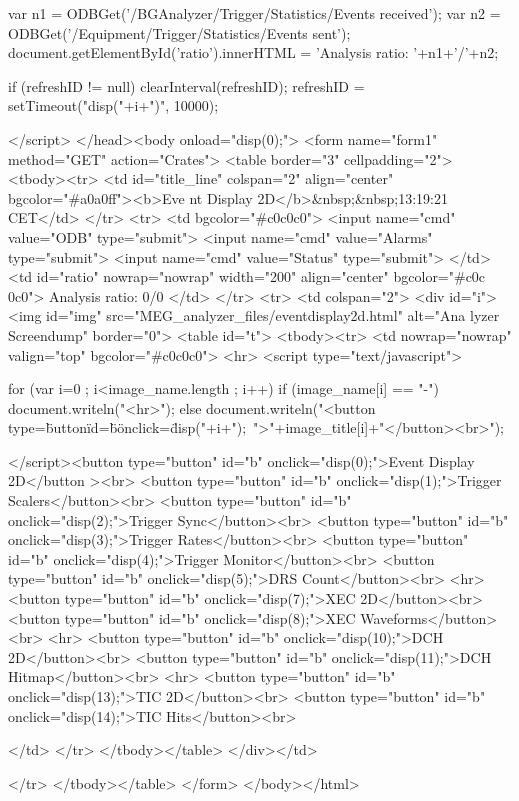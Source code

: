 \begin{DoxyCode}
{    var n1 = ODBGet('/BGAnalyzer/Trigger/Statistics/Events received');
    var n2 = ODBGet('/Equipment/Trigger/Statistics/Events sent');
    document.getElementById('ratio').innerHTML = 'Analysis ratio: '+n1+'/'+n2;

    if (refreshID != null)
      clearInterval(refreshID);
    refreshID = setTimeout("disp("+i+")", 10000);
  }
  
  </script>
  </head><body onload="disp(0);">
    <form name="form1" method="GET" action="Crates">
      <table border="3" cellpadding="2">
        <tbody><tr>
          <td id="title_line" colspan="2" align="center" bgcolor="#a0a0ff"><b>Eve
      nt Display 2D</b>&nbsp;&nbsp;13:19:21  CET</td>
        </tr>
        <tr>
          <td bgcolor="#c0c0c0">
            <input name="cmd" value="ODB" type="submit">
            <input name="cmd" value="Alarms" type="submit">
            <input name="cmd" value="Status" type="submit">
          </td>
          <td id="ratio" nowrap="nowrap" width="200" align="center" bgcolor="#c0c
      0c0">
            Analysis ratio: 0/0
          </td>
        </tr>  
        <tr>
          <td colspan="2">
            <div id="i">
              <img id="img" src="MEG_analyzer_files/eventdisplay2d.html" alt="Ana
      lyzer Screendump" border="0">
              <table id="t">
                <tbody><tr>
                  <td nowrap="nowrap" valign="top" bgcolor="#c0c0c0">
                    <hr>
<script type="text/javascript">

  for (var i=0 ; i<image_name.length ; i++)
    if (image_name[i] == "-")
       document.writeln("<hr>");
    else
       document.writeln("<button type=\"button\" id=\"b\" onclick=\"disp("+i+");\
      ">"+image_title[i]+"</button><br>");

</script><button type="button" id="b" onclick="disp(0);">Event Display 2D</button
      ><br>
<button type="button" id="b" onclick="disp(1);">Trigger Scalers</button><br>
<button type="button" id="b" onclick="disp(2);">Trigger Sync</button><br>
<button type="button" id="b" onclick="disp(3);">Trigger Rates</button><br>
<button type="button" id="b" onclick="disp(4);">Trigger Monitor</button><br>
<button type="button" id="b" onclick="disp(5);">DRS Count</button><br>
<hr>
<button type="button" id="b" onclick="disp(7);">XEC 2D</button><br>
<button type="button" id="b" onclick="disp(8);">XEC Waveforms</button><br>
<hr>
<button type="button" id="b" onclick="disp(10);">DCH 2D</button><br>
<button type="button" id="b" onclick="disp(11);">DCH Hitmap</button><br>
<hr>
<button type="button" id="b" onclick="disp(13);">TIC 2D</button><br>
<button type="button" id="b" onclick="disp(14);">TIC Hits</button><br>

                  </td>
                </tr>
              </tbody></table>
            </div></td>
          
        </tr>
      </tbody></table>
    </form>
  </body></html>
\end{DoxyCode}


